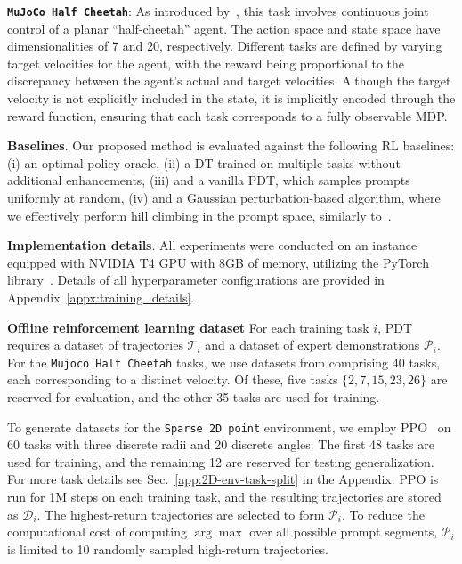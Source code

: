 \documentclass{article} %
\begin{document}
\quad\textbf{\texttt{MuJoCo Half Cheetah}}: As introduced by~\citet{xu2022prompting}, this task involves continuous joint control of a planar ``half-cheetah'' agent. The action space and state space have dimensionalities of 7 and 20, respectively. Different tasks are defined by varying target velocities for the agent, with the reward being proportional to the discrepancy between the agent's actual and target velocities. Although the target velocity is not explicitly included in the state, it is implicitly encoded through the reward function, ensuring that each task corresponds to a fully observable MDP.

\textbf{Baselines}. Our proposed method is evaluated against the following RL baselines: (i) an optimal policy oracle, (ii) a DT trained on multiple tasks without additional enhancements, (iii) and a vanilla PDT, which samples prompts uniformly at random, 
(iv) and a Gaussian perturbation-based algorithm, where we effectively perform hill climbing in the prompt space, similarly to~\citet{hu2023prompt}.

\textbf{Implementation details}. All experiments were conducted on an instance equipped with NVIDIA T4 GPU with 8GB of memory, utilizing the PyTorch library~\citep{paszke2019pytorch}. Details of all hyperparameter configurations are provided in Appendix~\ref{appx:training_details}.

\textbf{Offline reinforcement learning dataset}
For each training task $i$, PDT requires a dataset of trajectories $\mathcal{T}_i$ and a dataset of expert demonstrations $\mathcal{P}_i$. For the \texttt{Mujoco Half Cheetah} tasks, we use datasets from \citet{xu2022prompting} comprising 40 tasks, each corresponding to a distinct velocity. Of these, five tasks $\{2, 7, 15, 23, 26\}$ are reserved for evaluation, and the other 35 tasks are used for training. 

To generate datasets for the \texttt{Sparse 2D point} environment, we employ PPO~\citep{schulman2017proximal} on 60 tasks with three discrete radii and 20 discrete angles. The first 48 tasks are used for training, and the remaining 12 are reserved for testing generalization. 
For more task details see Sec.~\ref{app:2D-env-task-split} in the Appendix.
PPO is run for 1M steps on each training task, and the resulting trajectories are stored as $\mathcal{D}_i$. The highest-return trajectories are selected to form $\mathcal{P}_i$. To reduce the computational cost of computing $\arg\max$ over all possible prompt segments, $\mathcal{P}_i$ is limited to 10 randomly sampled high-return trajectories.
\end{document}
